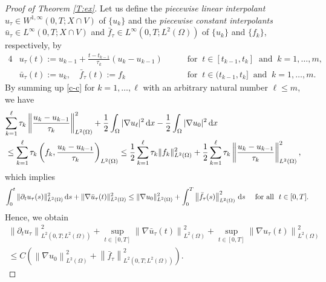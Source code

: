 \documentclass[reqno,10pt]{amsart}
\begin{document}
\begin{proof}[Proof of Theorem \ref{T:ex}]
Let us define the \emph{piecewise linear interpolant} $u_\tau \in
W^{1,\infty}(0,T;X\cap V)$ of $\{u_k\}$ and the \emph{piecewise
constant interpolants} $\bar{u}_\tau \in L^\infty (0,T;X\cap V)$ and
$\bar{f}_\tau \in L^\infty (0,T;L^2(\Omega))$ of $\{u_k\}$ and
$\{f_k\}$, respectively, by
\begin{alignat*}{4}
&u_\tau(t):=u_{k-1}+\frac{t-t_{k-1}}{\tau_k}(u_k-u_{k-1})
\quad && \mbox{ for } \ t\in [t_{k-1},t_k] \ \mbox{ and } \ k=1,\ldots,m,\\
&\bar{u}_\tau(t):=u_k, \quad \bar{f}_\tau(t):=f_k
\quad && \mbox{ for } \ t\in (t_{k-1},t_k] \ \mbox{ and } \ k=1,\ldots,m.
\end{alignat*}
By summing up \eqref{c-c} for $k=1,\ldots,\ell$ with an arbitrary
natural number $\ell \leq m$, we have
\begin{align}
\lefteqn{
\sum_{k = 1}^\ell \tau_k
\left\|\dfrac{u_k - u_{k-1}}{\tau_k}\right\|_{L^2(\Omega)}^2 
+ \dfrac 1 2 \int_\Omega |\nabla u_\ell|^2 \, {\text{\rm d}} x
- \dfrac 1 2 \int_\Omega |\nabla u_0|^2 \, {\text{\rm d}} x
}\nonumber \\
&\leq \sum_{k=1}^\ell \tau_k \left( f_k,
 \dfrac{u_k-u_{k-1}}{\tau_k} \right)_{L^2(\Omega)} 
\leq \dfrac 1 2 \sum_{k=1}^\ell \tau_k \|f_k\|_{L^2(\Omega)}^2
+ \dfrac 1 2 \sum_{k=1}^\ell \tau_k \left\|
 \dfrac{u_k-u_{k-1}}{\tau_k}\right\|_{L^2(\Omega)}^2,\label{ei-dsc}
\end{align}
which implies
\begin{align*}
\int_0^t
\|\partial_t u_\tau(s)\|_{L^2(\Omega)}^2 \, {\text{\rm d}} s
+ \|\nabla \bar u_\tau(t)\|_{L^2(\Omega)}^2
\le
\|\nabla u_0\|_{L^2(\Omega)}^2
+\int_0^T \left\|\bar f_\tau(s)\right\|_{L^2(\Omega)}^2 \, {\text{\rm d}} s
\quad
\mbox{ for all } \ t \in [0,T].
\end{align*}
Hence, we obtain
\begin{align}
\left\| \partial_t u_\tau \right\|_{L^2(0,T;L^2(\Omega))}^2
 + \sup_{t \in [0,T]} \left\| \nabla \bar{u}_\tau(t)
 \right\|_{L^2(\Omega)}^2
 + \sup_{t \in [0,T]} \left\| \nabla u_\tau(t) \right\|_{L^2(\Omega)}^2
\qquad \nonumber\\
\le
C \left( \left\| \nabla u_0 \right\|_{L^2(\Omega)}^2
+\left\| \bar f_\tau\right\|_{L^2(0,T;L^2(\Omega))}^2 \right).
\label{est1}
\end{align}


\end{proof}
\end{document}

